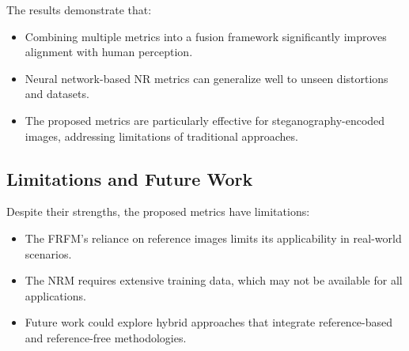 The results demonstrate that:
\begin{itemize}
    \item Combining multiple metrics into a fusion framework significantly improves alignment with human perception.
    \item Neural network-based NR metrics can generalize well to unseen distortions and datasets.
    \item The proposed metrics are particularly effective for steganography-encoded images, addressing limitations of traditional approaches.
\end{itemize}

\subsection{Limitations and Future Work}

Despite their strengths, the proposed metrics have limitations:
\begin{itemize}
    \item The FRFM's reliance on reference images limits its applicability in real-world scenarios.
    \item The NRM requires extensive training data, which may not be available for all applications.
    \item Future work could explore hybrid approaches that integrate reference-based and reference-free methodologies.
\end{itemize}
